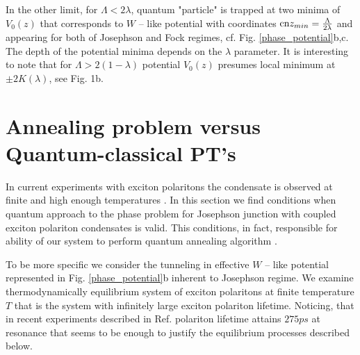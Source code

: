 \documentclass[aps, pre, preprint, groupedaddress, superscriptaddress, showkeys, showpacs] {revtex4-1}
\newcommand{\red}{\color{red}}
\begin{document}
In the other limit, for $\Lambda < 2 \lambda$, quantum "particle" is trapped at two minima of $V_0(z)$ that corresponds to $W$ -- like potential with coordinates $\textrm{cn}{z_{min}} = \frac{\Lambda}{2 \lambda}$ and appearing for both of Josephson and Fock regimes, cf. Fig. \ref{phase_potential}b,c.  
The depth of the potential minima depends on the $\lambda$ parameter.
It is interesting to note that for $\Lambda > 2(1 - \lambda)$ potential $V_0(z)$ presumes local minimum at $\pm 2 K(\lambda)$, see Fig. 1b.

%

%
%
%
%


\section{Annealing problem versus Quantum-classical PT's \label{sec:quantum_classical}}

In current experiments with exciton polaritons  the condensate is observed at finite and high enough temperatures \cite{Sanvitto,Guillet}.
In this section we find conditions when quantum approach to the phase problem for Josephson junction with coupled exciton polariton condensates is valid. This conditions, in fact, responsible for ability of our system to perform quantum annealing algorithm \cite{Das}.

To  be more specific we consider the tunneling in  effective $W$ -- like potential represented in Fig. \ref{phase_potential}b  inherent to  Josephson regime. We examine thermodynamically equilibrium  system of exciton polaritons at finite temperature $T$ that is the system with infinitely large  exciton polariton lifetime.  Noticing, that in  recent experiments  described in Ref. \cite{Snoke_2017} polariton lifetime attains  $275ps$ at resonance that seems to be enough to justify the equilibrium  processes described below.
\end{document}
